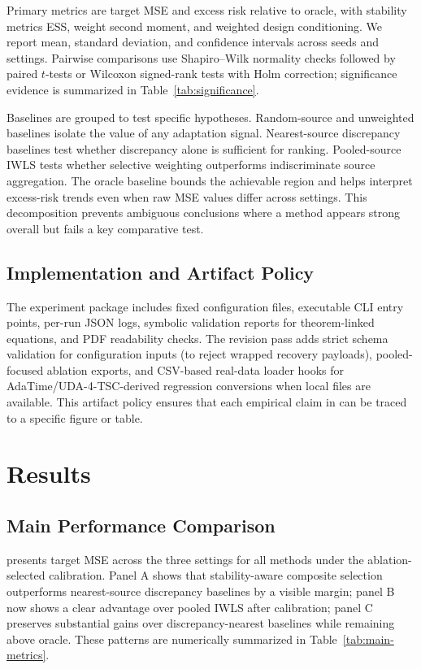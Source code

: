 \documentclass{article} %
\begin{document}
Primary metrics are target MSE and excess risk relative to oracle, with stability metrics ESS, weight second moment, and weighted design conditioning. We report mean, standard deviation, and confidence intervals across seeds and settings. Pairwise comparisons use Shapiro--Wilk normality checks followed by paired \(t\)-tests or Wilcoxon signed-rank tests with Holm correction; significance evidence is summarized in Table~\ref{tab:significance}.

Baselines are grouped to test specific hypotheses. Random-source and unweighted baselines isolate the value of any adaptation signal. Nearest-source discrepancy baselines test whether discrepancy alone is sufficient for ranking. Pooled-source IWLS tests whether selective weighting outperforms indiscriminate source aggregation. The oracle baseline bounds the achievable region and helps interpret excess-risk trends even when raw MSE values differ across settings. This decomposition prevents ambiguous conclusions where a method appears strong overall but fails a key comparative test.

\subsection{Implementation and Artifact Policy}
The experiment package includes fixed configuration files, executable CLI entry points, per-run JSON logs, symbolic validation reports for theorem-linked equations, and PDF readability checks. The revision pass adds strict schema validation for configuration inputs (to reject wrapped recovery payloads), pooled-focused ablation exports, and CSV-based real-data loader hooks for AdaTime/UDA-4-TSC-derived regression conversions when local files are available. This artifact policy ensures that each empirical claim in  can be traced to a specific figure or table.

\section{Results}
\label{sec:results}
\subsection{Main Performance Comparison}
 presents target MSE across the three settings for all methods under the ablation-selected calibration. Panel A shows that stability-aware composite selection outperforms nearest-source discrepancy baselines by a visible margin; panel B now shows a clear advantage over pooled IWLS after calibration; panel C preserves substantial gains over discrepancy-nearest baselines while remaining above oracle. These patterns are numerically summarized in Table~\ref{tab:main-metrics}.
\end{document}
